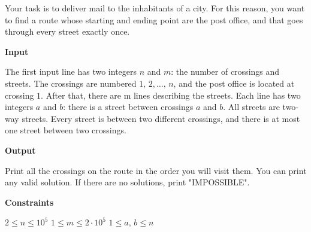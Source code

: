 Your task is to deliver mail to the inhabitants of a city. For this reason, you want to find a route whose starting and ending point are the post office, and that goes through every street exactly once.

\vspace{0.3cm}\noindent\textbf{Input}

The first input line has two integers $n$ and $m$: the number of crossings and streets. The crossings are numbered $1,\,2,\ldots,\,n$, and the post office is located at crossing $1$.
After that, there are m lines describing the streets. Each line has two integers $a$ and $b$: there is a street between crossings $a$ and $b$. All streets are two-way streets.
Every street is between two different crossings, and there is at most one street between two crossings.

\vspace{0.3cm}\noindent\textbf{Output}

Print all the crossings on the route in the order you will visit them. You can print any valid solution.
If there are no solutions, print "IMPOSSIBLE".

\vspace{0.3cm}\noindent\textbf{Constraints}

$2\leq n\leq 10^5$
$1\leq m\leq 2 \cdot 10^5$
$1\leq a,\,b\leq n$
